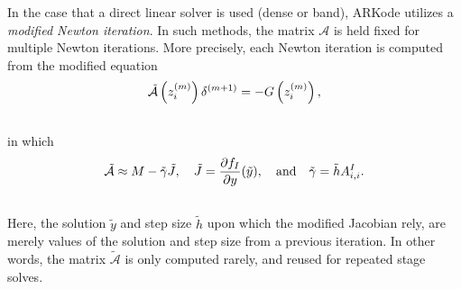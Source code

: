 \documentclass[letterpaper,10pt,english]{sphinxmanual}
\begin{document}
In the case that a direct linear solver is used (dense or band),
ARKode utilizes a \emph{modified Newton iteration}. In such methods, the
matrix ${\mathcal A}$ is held fixed for multiple Newton
iterations.  More precisely, each Newton iteration is computed from
the modified equation
\label{Mathematics:equation-modified_Newton_system}\begin{gather}
\begin{split}\tilde{\mathcal A}\left(z_i^{(m)}\right) \delta^{(m+1)} = -G\left(z_i^{(m)}\right),\end{split}\label{Mathematics-modified_Newton_system}\\\begin{split}\end{split}\notag
\end{gather}
in which
\label{Mathematics:equation-modified_NewtonMatrix}\begin{gather}
\begin{split}\tilde{\mathcal A} \approx M - \tilde{\gamma} \tilde{J}, \quad \tilde{J} =
\frac{\partial f_I}{\partial y}(\tilde y), \quad\text{and}\quad
\tilde{\gamma} = \tilde{h} A^I_{i,i}.\end{split}\label{Mathematics-modified_NewtonMatrix}\\\begin{split}\end{split}\notag
\end{gather}
Here, the solution $\tilde{y}$ and step size $\tilde{h}$
upon which the modified Jacobian rely, are merely values of the
solution and step size from a previous iteration.  In other words, the
matrix $\tilde{\mathcal A}$ is only computed rarely, and reused for
repeated stage solves.
\end{document}
